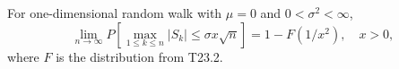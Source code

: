 For one-dimensional random walk with \(\mu = 0\) and \(0 < \sigma^2 < \infty\),
\[
\lim_{n \to \infty} P\!\left[\max_{1 \leq k \leq n} |S_k| \leq \sigma x \sqrt{n}\right] = 1 - F(1/x^2), \quad x > 0,
\]
where \(F\) is the distribution from T23.2.
